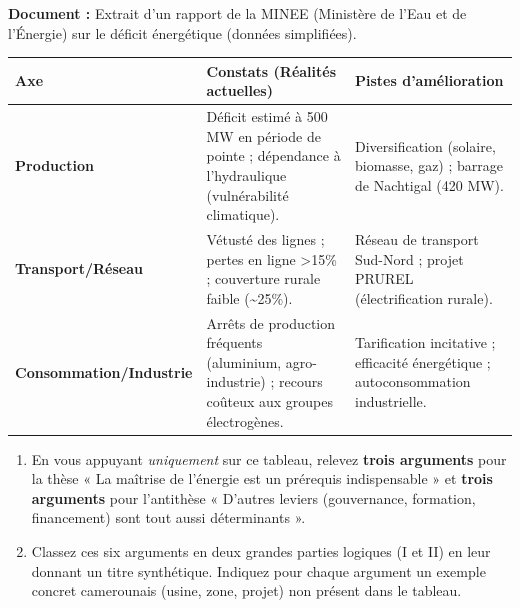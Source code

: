 \documentclass[11pt]{article}
\begin{document}
\begin{exercice}
\textbf{Document :} Extrait d'un rapport de la MINEE (Ministère de l'Eau et de l'Énergie) sur le déficit énergétique (données simplifiées).

\begin{tabularx}{\linewidth}{>{\bfseries}l X X}
\toprule
\textbf{Axe} & \textbf{Constats (Réalités actuelles)} & \textbf{Pistes d'amélioration} \\
\midrule
Production & Déficit estimé à 500 MW en période de pointe ; dépendance à l'hydraulique (vulnérabilité climatique). & Diversification (solaire, biomasse, gaz) ; barrage de Nachtigal (420 MW). \\
Transport/Réseau & Vétusté des lignes ; pertes en ligne \textgreater 15\% ; couverture rurale faible (\textasciitilde 25\%). & Réseau de transport Sud-Nord ; projet PRUREL (électrification rurale). \\
Consommation/Industrie & Arrêts de production fréquents (aluminium, agro-industrie) ; recours coûteux aux groupes électrogènes. & Tarification incitative ; efficacité énergétique ; autoconsommation industrielle. \\
\bottomrule
\end{tabularx}

\begin{enumerate}
    \item En vous appuyant \textit{uniquement} sur ce tableau, relevez \textbf{trois arguments} pour la thèse « La maîtrise de l'énergie est un prérequis indispensable » et \textbf{trois arguments} pour l'antithèse « D'autres leviers (gouvernance, formation, financement) sont tout aussi déterminants ».
    \item Classez ces six arguments en deux grandes parties logiques (I et II) en leur donnant un titre synthétique. Indiquez pour chaque argument un exemple concret camerounais (usine, zone, projet) non présent dans le tableau.
\end{enumerate}
\end{exercice}
\end{document}
